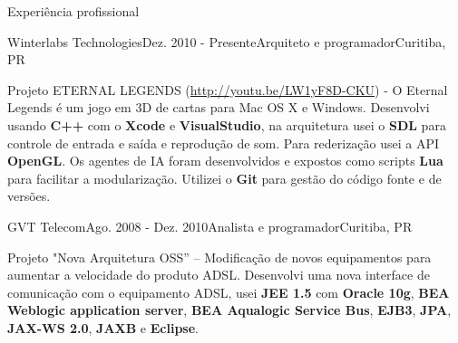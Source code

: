\documentclass{resume}
\begin{document}
\begin{rSection}{Experiência profissional}
\begin{rSubsection}{Winterlabs Technologies}{Dez. 2010 - Presente}{Arquiteto e programador}{Curitiba, PR}
    \item Projeto ETERNAL LEGENDS (\url{http://youtu.be/LW1yF8D-CKU}) - O Eternal Legends é um jogo em 3D de cartas para Mac OS X e Windows. Desenvolvi usando \textbf{C++} com o \textbf{Xcode} e \textbf{VisualStudio}, na arquitetura usei o \textbf{SDL} para controle de entrada e saída e reprodução de som. Para rederização usei a API \textbf{OpenGL}. Os agentes de IA foram desenvolvidos e expostos como scripts \textbf{Lua} para facilitar a modularização. Utilizei o \textbf{Git} para gestão do código fonte e de versões. \\
    \end{rSubsection}
    \begin{rSubsection}{GVT Telecom}{Ago. 2008 - Dez. 2010}{Analista e programador}{Curitiba, PR}
    \item Projeto "Nova Arquitetura OSS” – Modificação de novos equipamentos para aumentar a velocidade do produto ADSL. Desenvolvi uma nova interface de comunicação com o equipamento ADSL, usei \textbf{JEE 1.5} com \textbf{Oracle 10g}, \textbf{BEA Weblogic application server}, \textbf{BEA Aqualogic Service Bus}, \textbf{EJB3}, \textbf{JPA}, \textbf{JAX-WS 2.0}, \textbf{JAXB} e \textbf{Eclipse}.\\

\end{rSubsection}
\end{rSection}
\end{document}
